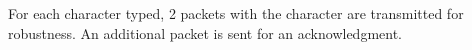 For each character typed, 2 packets with the character are transmitted for robustness. An additional packet is sent for an acknowledgment.